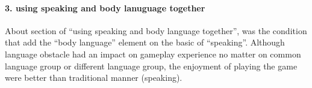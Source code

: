 \paragraph{3. using speaking and body lanuguage together}
About section of ``using speaking and body language together'', was the condition that add the ``body language'' element on the basic of ``speaking''. Although language obstacle had an impact on gameplay experience no matter on common language group or different language group, the enjoyment of playing the game were better than traditional manner (speaking). 



